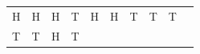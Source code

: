 {\begin{tabular}[t]{|l|l|l|l|l|l|l|l|l|l|}
        H &
        H &
        H &
        T &
        H &
        H &
        T &
        T &
        T%
     \tabularnewline\cline{1-1}\cline{2-2}\cline{3-3}\cline{4-4}\cline{5-5}\cline{6-6}\cline{7-7}\cline{8-8}\cline{9-9}\cline{10-10}
        T &
        T &
        H &
        T &

\end{tabular}}
